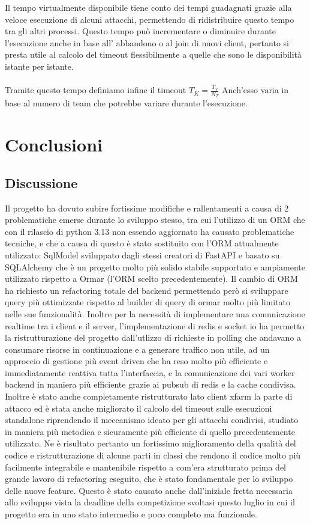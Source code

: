 \documentclass[11pt]{article}
\begin{document}
Il tempo virtualmente disponibile tiene conto dei tempi guadagnati grazie alla veloce esecuzione di alcuni attacchi, permettendo di ridistribuire questo tempo tra gli altri processi. Questo tempo può incrementare o diminuire durante l'esecuzione anche in base all' abbandono o al join di nuovi client, pertanto si presta utile al calcolo del timeout flessibilmente a quelle che sono le disponibilità istante per istante.\\\\
Tramite questo tempo definiamo infine il timeout $T_K = \frac{T_V}{N_T}$
Anch'esso varia in base al numero di team che potrebbe variare durante l'esecuzione.
\section{Conclusioni}
\subsection{Discussione}
Il progetto ha dovuto subire fortissime modifiche e rallentamenti a causa di 2 problematiche emerse durante lo sviluppo stesso, tra cui l'utilizzo di un ORM che con il rilascio di python 3.13 non essendo aggiornato ha causato problematiche tecniche, e che a causa di questo è stato sostituito con l'ORM attualmente utilizzato: SqlModel sviluppato dagli stessi creatori di FastAPI e basato su SQLAlchemy che è un progetto molto più solido stabile supportato e ampiamente utilizzato rispetto a Ormar (l'ORM scelto precedentemente). Il cambio di ORM ha richiesto un refactoring totale del backend permettendo però si sviluppare query più ottimizzate rispetto al builder di query di ormar molto più limitato nelle sue funzionalità.
Inoltre per la necessità di implementare una comunicazione realtime tra i client e il server, l'implementazione di redis e socket io ha permetto la ristrutturazione del progetto dall'utlizzo di richieste in polling che andavano a consumare risorse in continuazione e a generare traffico non utile, ad un approccio di gestione più event driven che ha reso molto più efficiente e immediatamente reattiva tutta l'interfaccia, e la comunicazione dei vari worker backend in maniera più efficiente grazie ai pubsub di redis e la cache condivisa. Inoltre è stato anche completamente ristrutturato lato client xfarm la parte di attacco ed è stata anche migliorato il calcolo del timeout sulle esecuzioni standalone riprendendo il meccanismo ideato per gli attacchi condivisi, studiato in maniera più metodica e sicuramente più efficiente di quello precedentemente utilizzato. Ne è risultato pertanto un fortissimo miglioramento della qualità del codice e ristrutturazione di alcune parti in classi che rendono il codice molto più facilmente integrabile e mantenibile rispetto a com'era strutturato prima del grande lavoro di refactoring eseguito, che è stato fondamentale per lo sviluppo delle nuove feature. Questo è stato causato anche dall'iniziale fretta necessaria allo sviluppo vista la deadline della competizione svoltasi questo luglio in cui il progetto era in uno stato intermedio e poco completo ma funzionale.
\end{document}
